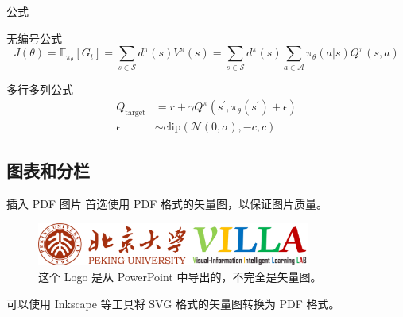 \documentclass[aspectratio=169]{ctexbeamer}
\begin{document}
\begin{frame}{公式}
  \begin{block}{无编号公式}
    \begin{equation*}
        J(\theta) = \mathbb{E}_{\pi_\theta}[G_t] = \sum_{s\in\mathcal{S}} d^\pi (s)V^\pi(s)=\sum_{s\in\mathcal{S}} d^\pi(s)\sum_{a\in\mathcal{A}}\pi_\theta(a|s)Q^\pi(s,a)
    \end{equation*}
  \end{block}
  \begin{block}{多行多列公式\footnotemark[1]}
      \begin{align}
          Q_\mathrm{target}&=r+\gamma Q^\pi(s^\prime, \pi_\theta(s^\prime)+\epsilon)\\
          \epsilon&\sim\mathrm{clip}(\mathcal{N}(0, \sigma), -c, c)\nonumber
      \end{align}
  \end{block}
\end{frame}

\subsection{图表和分栏}

\begin{frame}{插入 PDF 图片}
  首选使用 PDF 格式的矢量图，以保证图片质量。
  \begin{figure}
    \centering
    \includegraphics[width=0.8\textwidth]{imgs/pkuvilla.pdf}
    \caption{这个 Logo 是从 PowerPoint 中导出的，不完全是矢量图。}
  \end{figure}
  可以使用 Inkscape 等工具将 SVG 格式的矢量图转换为 PDF 格式。
\end{frame}
\end{document}
